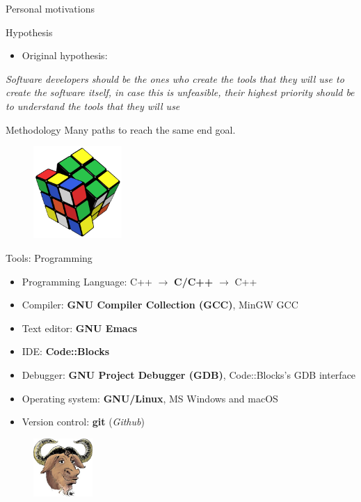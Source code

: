 \documentclass{beamer}
\begin{document}
\begin{frame}{Personal motivations}
\begin{minipage}{0.45\textwidth}
\begin{figure}
    \end{figure}
    \end{minipage}
\end{frame}

\begin{frame}{Hypothesis}
  \begin{itemize}
    \item{Original hypothesis:}
  \end{itemize}
  \textit{Software developers should be the ones who create the tools that they will use to create the software itself, in case this is unfeasible, their highest priority should be to understand the tools that they will use}
\end{frame}

\begin{frame}{Methodology}
  Many paths to reach the same end goal.
  \vfill
  \begin{figure} [h]
    \centering
    \includegraphics[width=0.3\textwidth]{img/rubik}
  \end{figure}
\end{frame}

\begin{frame}{Tools: Programming}
  \begin{itemize}
  \item{Programming Language: C++ $\rightarrow$ \textbf{C/C++} $\rightarrow$ C++}
  \item{Compiler: \textbf{GNU Compiler Collection (GCC)}, MinGW GCC}
  \item{Text editor: \textbf{GNU Emacs}}
  \item{IDE: \textbf{Code::Blocks}}
  \item{Debugger: \textbf{GNU Project Debugger (GDB)}, Code::Blocks's GDB interface}
  \item{Operating system: \textbf{GNU/Linux}, MS Windows and macOS}
  \item{Version control: \textbf{git} (\textit{Github})}
  \end{itemize}
  \begin{figure} [h]
    \centering
    \includegraphics[width=0.2\textwidth]{img/reiss-head}
  \end{figure}
\end{frame}
\end{document}
